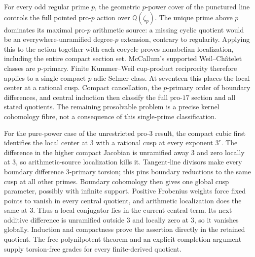 \documentclass[11pt]{article}
\newcommand{\Q}{\mathbb Q}
\theoremstyle{definition}
\begin{document}
For every odd regular prime $p$, the geometric $p$-power cover of
the punctured line controls the full pointed pro-$p$ action over
$\Q(\zeta_p)$. The unique prime above $p$ dominates its maximal
pro-$p$ arithmetic source: a missing cyclic quotient would be an
everywhere-unramified degree-$p$ extension, contrary to regularity.
Applying this to the action together with each cocycle proves
nonabelian localization, including the entire compact section set.
McCallum's supported Weil--Ch\^atelet classes are $p$-primary.
Finite Kummer--Weil cup-product reciprocity therefore applies to
a single compact $p$-adic Selmer class. At seventeen this places
the local center at a rational cusp. Compact cancellation, the
$p$-primary order of boundary differences, and central induction
then classify the full pro-$17$ section and all stated quotients.
The remaining prosolvable problem is a precise kernel cohomology
fibre, not a consequence of this single-prime classification.

For the pure-power case of the unrestricted pro-$3$ result, the compact
 cubic first identifies the local center at $3$ with a rational cusp
 at every exponent $3^r$.
 The difference in the higher compact Jacobian is unramified away $3$
 and zero locally at $3$, so arithmetic-source localization kills it.
 Tangent-line divisors make every boundary difference $3$-primary torsion;
 this pins boundary reductions to the same cusp at all other primes.
 Boundary cohomology then gives one global cusp parameter, possibly
 with infinite support. Positive Frobenius weights force fixed points
 to vanish in every central quotient, and arithmetic localization does
 the same at $3$. Thus a local conjugator lies in the current central
 term. Its next additive difference is unramified outside $3$ and locally
 zero at $3$, so it vanishes globally. Induction and compactness prove
 the assertion directly in the retained quotient. The free-polynilpotent
 theorem and an explicit completion argument supply torsion-free grades
 for every finite-derived quotient.
\end{document}
